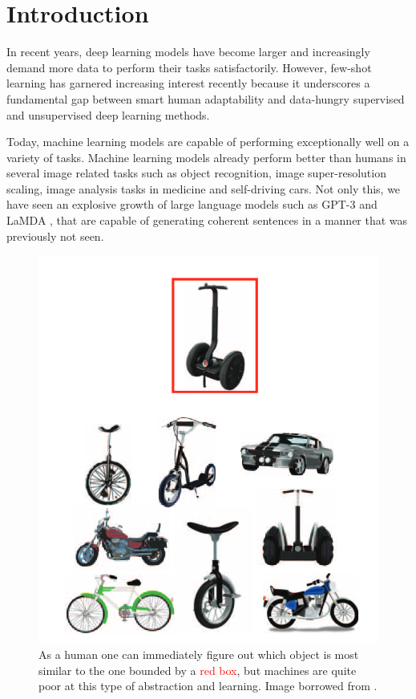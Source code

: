 \chapter{Introduction}\label{sec:intro}

In recent years, deep learning models have become larger and increasingly demand more data to perform their tasks satisfactorily. 
However, few-shot learning has garnered increasing interest recently because it underscores a fundamental gap between smart human adaptability and data-hungry supervised and unsupervised deep learning methods.

Today, machine learning models are capable of performing exceptionally well on a variety of tasks. Machine learning models already perform better than humans in several image related tasks such as object recognition, image super-resolution scaling, image analysis tasks in medicine and self-driving cars. Not only this, we have seen an explosive growth of large language models such as GPT-3 \parencite{brown2020language} and LaMDA \parencite{cohen2022lamda}, that are capable of generating coherent sentences in a manner that was previously not seen.
\begin{figure}[ht]
    \centering
    \includegraphics[scale=0.25]{chapters/assets/human-understanding.png}
    \caption{As a human one can immediately figure out which object is most similar to the one bounded by a \textcolor{red}{red box}, but machines are quite poor at this type of abstraction and learning. Image borrowed from \parencite{Lake2015Human-levelInduction}.}
    \label{fig:human-understanding}
\end{figure}

